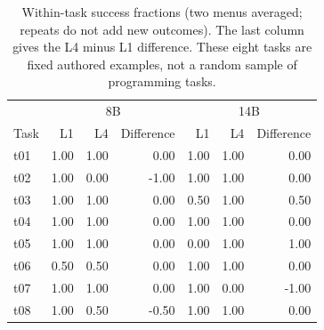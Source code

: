 \begin{table}[t]
\centering\small
\caption{Within-task success fractions (two menus averaged; repeats do not add new outcomes). The last column gives the L4 minus L1 difference. These eight tasks are fixed authored examples, not a random sample of programming tasks.}
\label{tab:tasks}
\begin{tabular}{lrrrrrr}
\toprule
& \multicolumn{3}{c}{8B} & \multicolumn{3}{c}{14B} \\
Task & L1 & L4 & Difference & L1 & L4 & Difference \\
\midrule
t01 & 1.00 & 1.00 & 0.00 & 1.00 & 1.00 & 0.00 \\
t02 & 1.00 & 0.00 & -1.00 & 1.00 & 1.00 & 0.00 \\
t03 & 1.00 & 1.00 & 0.00 & 0.50 & 1.00 & 0.50 \\
t04 & 1.00 & 1.00 & 0.00 & 1.00 & 1.00 & 0.00 \\
t05 & 1.00 & 1.00 & 0.00 & 0.00 & 1.00 & 1.00 \\
t06 & 0.50 & 0.50 & 0.00 & 1.00 & 1.00 & 0.00 \\
t07 & 1.00 & 1.00 & 0.00 & 1.00 & 0.00 & -1.00 \\
t08 & 1.00 & 0.50 & -0.50 & 1.00 & 1.00 & 0.00 \\
\bottomrule
\end{tabular}
\end{table}
